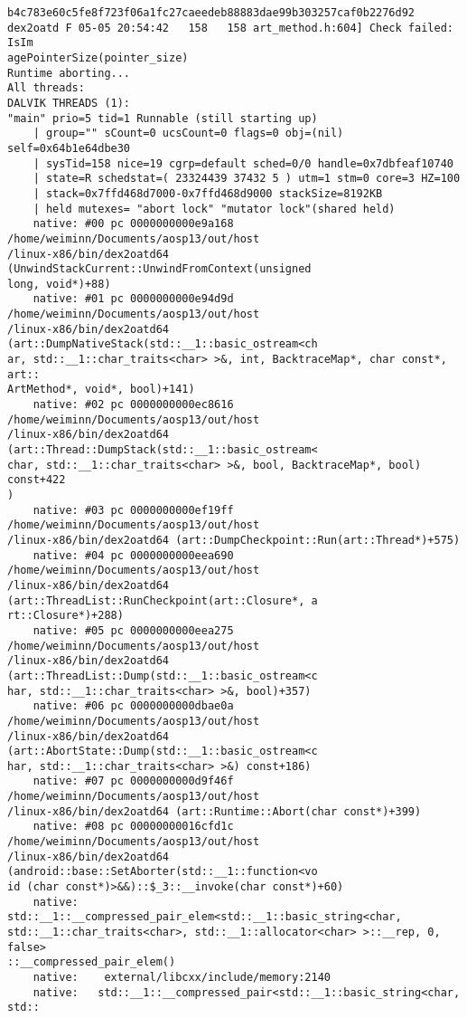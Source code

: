 \begin{lstlisting}
b4c783e60c5fe8f723f06a1fc27caeedeb88883dae99b303257caf0b2276d92
dex2oatd F 05-05 20:54:42   158   158 art_method.h:604] Check failed: IsIm
agePointerSize(pointer_size) 
Runtime aborting...
All threads:
DALVIK THREADS (1):
"main" prio=5 tid=1 Runnable (still starting up)
    | group="" sCount=0 ucsCount=0 flags=0 obj=(nil) self=0x64b1e64dbe30
    | sysTid=158 nice=19 cgrp=default sched=0/0 handle=0x7dbfeaf10740
    | state=R schedstat=( 23324439 37432 5 ) utm=1 stm=0 core=3 HZ=100
    | stack=0x7ffd468d7000-0x7ffd468d9000 stackSize=8192KB
    | held mutexes= "abort lock" "mutator lock"(shared held)
    native: #00 pc 0000000000e9a168  /home/weiminn/Documents/aosp13/out/host
/linux-x86/bin/dex2oatd64 (UnwindStackCurrent::UnwindFromContext(unsigned 
long, void*)+88)
    native: #01 pc 0000000000e94d9d  /home/weiminn/Documents/aosp13/out/host
/linux-x86/bin/dex2oatd64 (art::DumpNativeStack(std::__1::basic_ostream<ch
ar, std::__1::char_traits<char> >&, int, BacktraceMap*, char const*, art::
ArtMethod*, void*, bool)+141)
    native: #02 pc 0000000000ec8616  /home/weiminn/Documents/aosp13/out/host
/linux-x86/bin/dex2oatd64 (art::Thread::DumpStack(std::__1::basic_ostream<
char, std::__1::char_traits<char> >&, bool, BacktraceMap*, bool) const+422
)
    native: #03 pc 0000000000ef19ff  /home/weiminn/Documents/aosp13/out/host
/linux-x86/bin/dex2oatd64 (art::DumpCheckpoint::Run(art::Thread*)+575)
    native: #04 pc 0000000000eea690  /home/weiminn/Documents/aosp13/out/host
/linux-x86/bin/dex2oatd64 (art::ThreadList::RunCheckpoint(art::Closure*, a
rt::Closure*)+288)
    native: #05 pc 0000000000eea275  /home/weiminn/Documents/aosp13/out/host
/linux-x86/bin/dex2oatd64 (art::ThreadList::Dump(std::__1::basic_ostream<c
har, std::__1::char_traits<char> >&, bool)+357)
    native: #06 pc 0000000000dbae0a  /home/weiminn/Documents/aosp13/out/host
/linux-x86/bin/dex2oatd64 (art::AbortState::Dump(std::__1::basic_ostream<c
har, std::__1::char_traits<char> >&) const+186)
    native: #07 pc 0000000000d9f46f  /home/weiminn/Documents/aosp13/out/host
/linux-x86/bin/dex2oatd64 (art::Runtime::Abort(char const*)+399)
    native: #08 pc 00000000016cfd1c  /home/weiminn/Documents/aosp13/out/host
/linux-x86/bin/dex2oatd64 (android::base::SetAborter(std::__1::function<vo
id (char const*)>&&)::$_3::__invoke(char const*)+60)
    native:   std::__1::__compressed_pair_elem<std::__1::basic_string<char, 
std::__1::char_traits<char>, std::__1::allocator<char> >::__rep, 0, false>
::__compressed_pair_elem()
    native:    external/libcxx/include/memory:2140
    native:   std::__1::__compressed_pair<std::__1::basic_string<char, std::

\end{lstlisting}
